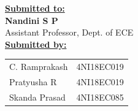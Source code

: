 \documentclass[a4paper,12pt]{report}
\begin{document}
\begin{titlepage}
\begin{center}
        \textbf{\underline{\large Submitted to:}} \\
        \textbf{\large Nandini S P} \\
        Assistant Professor, Dept. of ECE \\
        \vspace{1cm}
        \textbf{\underline{\large Submitted by:}} \\
        \vspace{0.5cm}
        \begin{tabular}[H]{l l}
            C. Ramprakash & 4NI18EC019 \\
            Pratyusha R & 4NI18EC019 \\
            Skanda Prasad & 4NI18EC085 \\
        \end{tabular}
    \end{center}
\end{titlepage}
\clearpage
\restoregeometry
\end{document}
